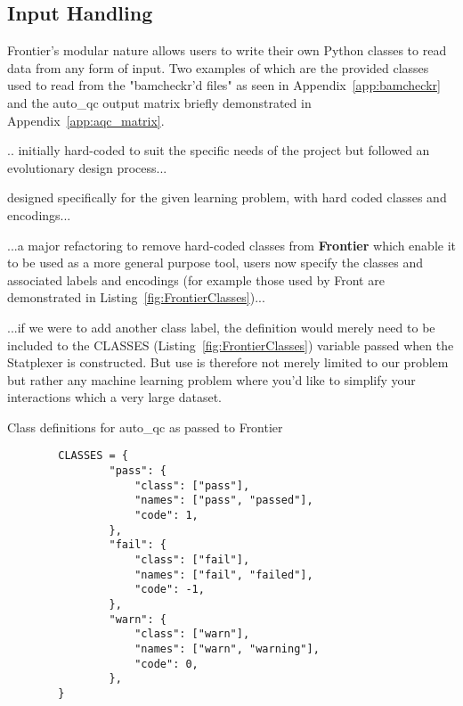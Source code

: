 \subsection{Input Handling}

Frontier's modular nature allows users to write their own Python classes to read
data from any form of input. Two examples of which are the provided classes used
to read from the "bamcheckr'd files" as seen in Appendix~\ref{app:bamcheckr} and
the auto\_qc output matrix briefly demonstrated in Appendix~\ref{app:aqc_matrix}.

.. initially hard-coded to suit the specific needs of the project but followed
an evolutionary design process...

designed specifically for the given learning problem, with hard coded
classes and encodings...

...a major refactoring to remove hard-coded classes from \textbf{Frontier} which
enable it to be used as a more general purpose tool, users now specify the
classes and associated labels and encodings (for example those used by Front are
demonstrated in Listing~\ref{fig:FrontierClasses})...

...if we were to add another
class label, the definition would merely need to be included to the CLASSES
(Listing~\ref{fig:FrontierClasses}) variable passed when the Statplexer is
constructed. But use is therefore not merely limited to our problem but rather
any machine learning problem where you'd like to simplify your interactions
which a very large dataset.

\begin{listing}[H]
    \caption[FrontierClasses]{Class definitions for auto\_qc as passed to Frontier}
    \label{fig:FrontierClasses}
    \begin{verbatim}
        CLASSES = {
                "pass": {
                    "class": ["pass"],
                    "names": ["pass", "passed"],
                    "code": 1,
                },
                "fail": {
                    "class": ["fail"],
                    "names": ["fail", "failed"],
                    "code": -1,
                },
                "warn": {
                    "class": ["warn"],
                    "names": ["warn", "warning"],
                    "code": 0,
                },
        }
    \end{verbatim}
\end{listing}

